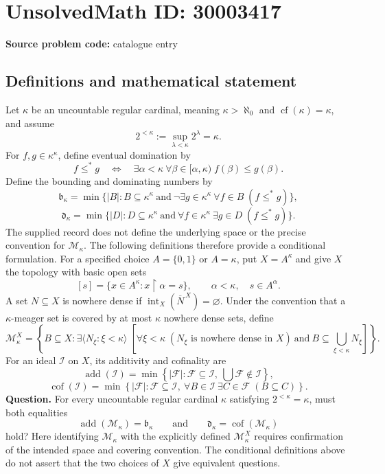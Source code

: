 \documentclass[11pt]{article}
\begin{document}
\section*{UnsolvedMath ID: 30003417}
\textbf{Source problem code:} catalogue entry
\subsection{Definitions and mathematical statement}
Let \(\kappa\) be an uncountable regular cardinal, meaning \(\kappa>\aleph_0\) and \(\operatorname{cf}(\kappa)=\kappa\), and assume
\[
2^{<\kappa}:=\sup_{\lambda<\kappa}2^\lambda=\kappa.
\]
For \(f,g\in\kappa^\kappa\), define eventual domination by
\[
f\leq^* g\quad\Longleftrightarrow\quad
\exists\alpha<\kappa\ \forall\beta\in[\alpha,\kappa)\; f(\beta)\leq g(\beta).
\]
Define the bounding and dominating numbers by
\[
\mathfrak b_\kappa=
\min\bigl\{|B|:B\subseteq\kappa^\kappa\ \text{and}\ \neg\exists g\in\kappa^\kappa\ \forall f\in B\;(f\leq^*g)\bigr\},
\]
\[
\mathfrak d_\kappa=
\min\bigl\{|D|:D\subseteq\kappa^\kappa\ \text{and}\ \forall f\in\kappa^\kappa\ \exists g\in D\;(f\leq^*g)\bigr\}.
\]
The supplied record does not define the underlying space or the precise convention for \(\mathcal M_\kappa\). The following definitions therefore provide a conditional formulation. For a specified choice \(A=\{0,1\}\) or \(A=\kappa\), put \(X=A^\kappa\) and give \(X\) the topology with basic open sets
\[
[s]=\{x\in A^\kappa:x\restriction\alpha=s\},
\qquad \alpha<\kappa,\quad s\in A^\alpha.
\]
A set \(N\subseteq X\) is nowhere dense if \(\operatorname{int}_X(\overline N^{\,X})=\varnothing\). Under the convention that a \(\kappa\)-meager set is covered by at most \(\kappa\) nowhere dense sets, define
\[
\mathcal M_\kappa^X=
\left\{B\subseteq X:\exists\langle N_\xi:\xi<\kappa\rangle\;
\left[\forall\xi<\kappa\;(N_\xi\text{ is nowhere dense in }X)
\ \text{and}\ B\subseteq\bigcup_{\xi<\kappa}N_\xi\right]\right\}.
\]
For an ideal \(\mathcal I\) on \(X\), its additivity and cofinality are
\[
\operatorname{add}(\mathcal I)=
\min\left\{|\mathcal F|:\mathcal F\subseteq\mathcal I,
\ \bigcup\mathcal F\notin\mathcal I\right\},
\]
\[
\operatorname{cof}(\mathcal I)=
\min\left\{|\mathcal F|:\mathcal F\subseteq\mathcal I,
\ \forall B\in\mathcal I\ \exists C\in\mathcal F\;(B\subseteq C)\right\}.
\]
\textbf{Question.} For every uncountable regular cardinal \(\kappa\) satisfying \(2^{<\kappa}=\kappa\), must both equalities
\[
\operatorname{add}(\mathcal M_\kappa)=\mathfrak b_\kappa
\qquad\text{and}\qquad
\mathfrak d_\kappa=\operatorname{cof}(\mathcal M_\kappa)
\]
hold?
Here identifying \(\mathcal M_\kappa\) with the explicitly defined \(\mathcal M_\kappa^X\) requires confirmation of the intended space and covering convention. The conditional definitions above do not assert that the two choices of \(X\) give equivalent questions.
\end{document}
